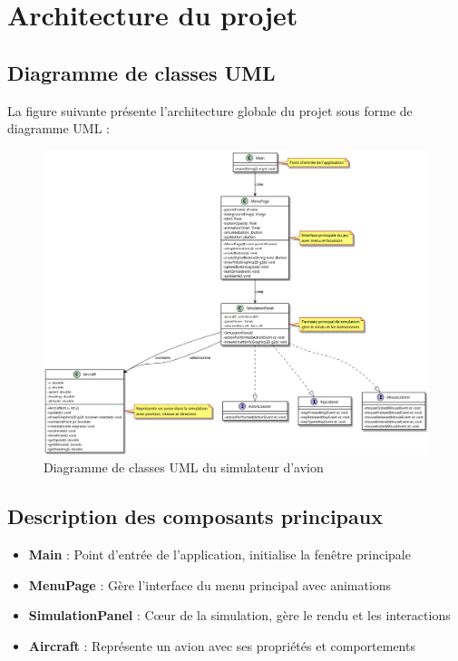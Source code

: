 \documentclass[12pt,a4paper]{article}
\begin{document}
\section{Architecture du projet}

\subsection{Diagramme de classes UML}
La figure suivante présente l'architecture globale du projet sous forme de diagramme UML :

\begin{figure}[!h]
    \centering
    \includegraphics[width=1.0\textwidth]{Simulateur d'Avion.png}
    \caption{Diagramme de classes UML du simulateur d'avion}
\end{figure}

\subsection{Description des composants principaux}
\begin{itemize}
    \item \textbf{Main} : Point d'entrée de l'application, initialise la fenêtre principale
    \item \textbf{MenuPage} : Gère l'interface du menu principal avec animations
    \item \textbf{SimulationPanel} : Cœur de la simulation, gère le rendu et les interactions
    \item \textbf{Aircraft} : Représente un avion avec ses propriétés et comportements
\end{itemize}
\end{document}
